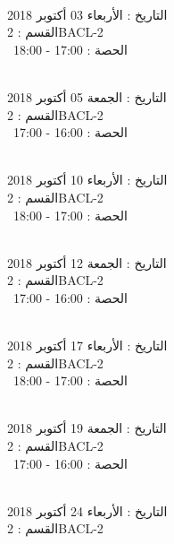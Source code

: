 \noindent\makebox[\linewidth]{\rule{\paperwidth}{0.4pt}}
 \\
التاريخ : الأربعاء 03 أكتوبر 2018 \\
القسم : 2BACL-2 \\
 \  
الحصة : 17:00 - 18:00 \\
\par
\noindent\makebox[\linewidth]{\rule{\paperwidth}{0.4pt}}
 \\
التاريخ : الجمعة 05 أكتوبر 2018 \\
القسم : 2BACL-2 \\
 \  
الحصة : 16:00 - 17:00 \\
\par
\noindent\makebox[\linewidth]{\rule{\paperwidth}{0.4pt}}
 \\
التاريخ : الأربعاء 10 أكتوبر 2018 \\
القسم : 2BACL-2 \\
 \  
الحصة : 17:00 - 18:00 \\
\par
\noindent\makebox[\linewidth]{\rule{\paperwidth}{0.4pt}}
 \\
التاريخ : الجمعة 12 أكتوبر 2018 \\
القسم : 2BACL-2 \\
 \  
الحصة : 16:00 - 17:00 \\
\par
\noindent\makebox[\linewidth]{\rule{\paperwidth}{0.4pt}}
 \\
التاريخ : الأربعاء 17 أكتوبر 2018 \\
القسم : 2BACL-2 \\
 \  
الحصة : 17:00 - 18:00 \\
\par
\noindent\makebox[\linewidth]{\rule{\paperwidth}{0.4pt}}
 \\
التاريخ : الجمعة 19 أكتوبر 2018 \\
القسم : 2BACL-2 \\
 \  
الحصة : 16:00 - 17:00 \\
\par
\noindent\makebox[\linewidth]{\rule{\paperwidth}{0.4pt}}
 \\
التاريخ : الأربعاء 24 أكتوبر 2018 \\
القسم : 2BACL-2 \\
